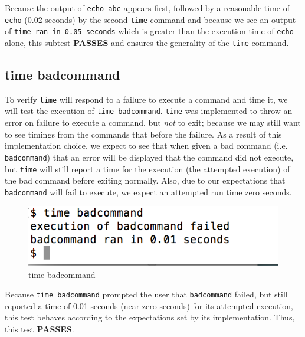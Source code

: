 \documentclass[11pt,letterpaper]{report}
\begin{document}
	Because the output of {\tt echo abc} appears first, followed by a reasonable time of {\tt echo} (0.02 seconds) by the second {\tt time} command and because we see an 
	output of {\tt time ran in 0.05 seconds} which is greater than the execution time of {\tt echo} alone, this subtest \textbf{PASSES} and ensures the generality of the {\tt time} command.

\newpage

\subsection*{time badcommand}
	To verify {\tt time} will respond to a failure to execute a command and time it, we will test the execution of {\tt time badcommand}. {\tt time} was implemented to throw an error on failure 
	to execute a command, but \emph{not} to exit; because we may still want to see timings from the commands that before the failure. 
	As a result of this implementation choice, we expect to see that when given a bad command (i.e. {\tt badcommand}) that an error will be displayed that the command did not execute, but 
	{\tt time} will still report a time for the execution (the attempted execution) of the bad command before exiting normally. Also, due to our expectations that {\tt badcommand} will fail to
	execute, we expect an attempted run time zero seconds.
	
\begin{figure}[h!]
\centering
\includegraphics[width=.7\linewidth]{time-badcommand.png}
\caption[timebadcommand]{time-badcommand}
\label{fig:timebadcommand}
\end{figure}
	

	Because {\tt time badcommand} prompted the user that {\tt badcommand} failed, but still reported a time of 0.01 seconds (near zero seconds) for its attempted execution, this test behaves 
	according to the expectations
	set by its implementation. Thus, this test \textbf{PASSES}.
	
\end{document}
